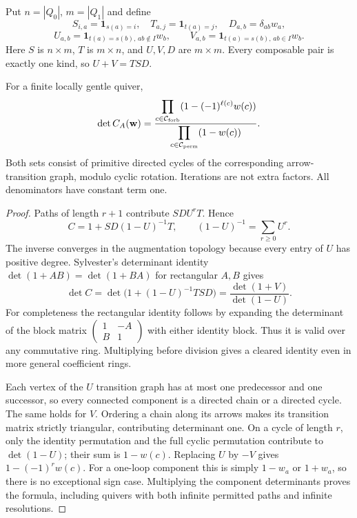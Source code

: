 Put $n=|Q_0|$, $m=|Q_1|$ and define
\[
 S_{i,a}=\mathbf1_{s(a)=i},\quad T_{a,j}=\mathbf1_{t(a)=j},\quad
 D_{a,b}=\delta_{ab}w_a,
\]
\[
 U_{a,b}=\mathbf1_{t(a)=s(b),\,ab\notin I}w_b,\qquad
 V_{a,b}=\mathbf1_{t(a)=s(b),\,ab\in I}w_b.
\]
Here $S$ is $n\times m$, $T$ is $m\times n$, and $U,V,D$ are $m\times m$. Every composable pair is exactly one kind, so $U+V=TSD$.

\begin{theorem}\label{thm:cartan}
For a finite locally gentle quiver,
\[
 \det C_A(\mathbf w)=
 \frac{\displaystyle\prod_{c\in\mathcal C_{\rm forb}}
       (1-(-1)^{\ell(c)}w(c))}
      {\displaystyle\prod_{c\in\mathcal C_{\rm perm}}(1-w(c))}.
\]
Both sets consist of primitive directed cycles of the corresponding arrow-transition graph, modulo cyclic rotation. Iterations are not extra factors. All denominators have constant term one.
\end{theorem}
\begin{proof}
Paths of length $r+1$ contribute $SDU^rT$. Hence
\[
 C=1+SD(1-U)^{-1}T,
 \qquad (1-U)^{-1}=\sum_{r\geq0}U^r.
\]
The inverse converges in the augmentation topology because every entry of $U$ has positive degree. Sylvester's determinant identity $\det(1+AB)=\det(1+BA)$ for rectangular $A,B$ gives
\[
 \det C=\det\bigl(1+(1-U)^{-1}TSD\bigr)
        =\frac{\det(1+V)}{\det(1-U)}.
\]
For completeness the rectangular identity follows by expanding the determinant of the block matrix $\left(\begin{smallmatrix}1&-A\\B&1\end{smallmatrix}\right)$ with either identity block. Thus it is valid over any commutative ring. Multiplying before division gives a cleared identity even in more general coefficient rings.

Each vertex of the $U$ transition graph has at most one predecessor and one successor, so every connected component is a directed chain or a directed cycle. The same holds for $V$. Ordering a chain along its arrows makes its transition matrix strictly triangular, contributing determinant one. On a cycle of length $r$, only the identity permutation and the full cyclic permutation contribute to $\det(1-U)$; their sum is $1-w(c)$. Replacing $U$ by $-V$ gives $1-(-1)^rw(c)$. For a one-loop component this is simply $1-w_a$ or $1+w_a$, so there is no exceptional sign case. Multiplying the component determinants proves the formula, including quivers with both infinite permitted paths and infinite resolutions.
\end{proof}

